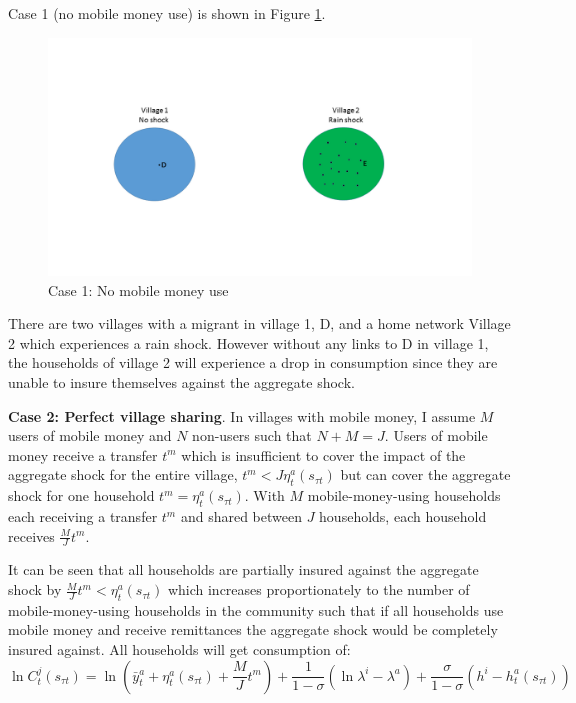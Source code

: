 Case 1 (no mobile money use) is shown in Figure \ref{fig: no link}. 
\begin{figure}[h]
    \centering
    \includegraphics[width=17cm,trim=0cm 4cm 0cm 4cm,clip=true, keepaspectratio]{Slide1new}
\caption{Case 1: No mobile money use}
    \label{fig: no link}
\end{figure}
There are two villages with a migrant in village 1, D, and a home network Village 2 which experiences a rain shock. However without any links to D in village 1, the households of village 2 will experience a drop in consumption since they are unable to insure themselves against the aggregate shock.

\textbf{Case 2: Perfect village sharing}. In villages with mobile money, I assume $M$ users of mobile money and $N$ non-users such that $N+M=J$. Users of mobile money receive a transfer $t^m$ which is insufficient to cover the impact of the aggregate shock for the entire village, $t^m<J\eta_t^a(s_{\tau t})$ but can cover the aggregate shock for one household $t^m=\eta_t^a(s_{\tau t})$. With $M$ mobile-money-using households each receiving a transfer $t^m$ and shared between $J$ households, each household receives $\frac{M}{J}t^m$. 

It can be seen that all households are partially insured against the aggregate shock by $\frac{M}{J} t^m<\eta_t^a(s_{\tau t})$ which increases proportionately to the number of mobile-money-using households in the community such that if all households use mobile money and receive remittances the aggregate shock would be completely insured against. All households will get consumption of:
\begin{equation} \label{eq: perfect sharing}
\ln C_t^j(s_{\tau t}) = \ln (\bar{y}^a_t + \eta_t^a(s_{\tau t}) + \frac{M}{J}t^m) + \frac{1}{1-\sigma}(\ln \lambda^i- \lambda^a) + \frac{\sigma}{1-\sigma}(h^i- h^a_t(s_{\tau t}))
\end{equation}

